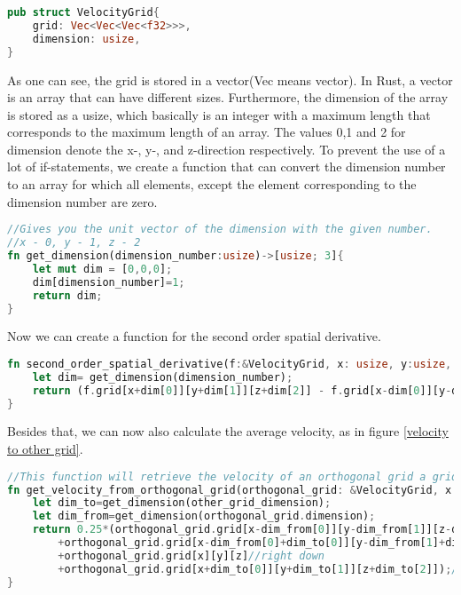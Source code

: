 \documentclass{article}
\begin{document}
\begin{lstlisting}[language=Rust, style=boxed, breaklines=true]
pub struct VelocityGrid{
    grid: Vec<Vec<Vec<f32>>>,
    dimension: usize,
}
\end{lstlisting}
As one can see, the grid is stored in a vector(Vec means vector). In Rust, a vector is an array that can have different sizes. Furthermore, the dimension of the array is stored as a usize, which basically is an integer with a maximum length that corresponds to the maximum length of an array. The values 0,1 and 2 for dimension denote the x-, y-, and z-direction respectively. To prevent the use of a lot of if-statements, we create a function that can convert the dimension number to an array for which all elements, except the element corresponding to the dimension number are zero. 
\begin{lstlisting}[language=Rust, style=boxed, breaklines=true]
//Gives you the unit vector of the dimension with the given number.
//x - 0, y - 1, z - 2
fn get_dimension(dimension_number:usize)->[usize; 3]{
    let mut dim = [0,0,0];
    dim[dimension_number]=1;
    return dim;
}
\end{lstlisting}
Now we can create a function for the second order spatial derivative.
\begin{lstlisting}[language=Rust, style=boxed, breaklines=true]
fn second_order_spatial_derivative(f:&VelocityGrid, x: usize, y:usize, z:usize, dimension_number:usize) -> f32{
    let dim= get_dimension(dimension_number);
    return (f.grid[x+dim[0]][y+dim[1]][z+dim[2]] - f.grid[x-dim[0]][y-dim[1]][z-dim[2]])/(2.0*GRIDELEMENTSCALE);
}
\end{lstlisting}
Besides that, we can now also calculate the average velocity, as in figure \ref{velocity to other grid}.
\begin{lstlisting}[language=Rust, style=boxed, breaklines=true]
//This function will retrieve the velocity of an orthogonal grid a grid point of another grid.
fn get_velocity_from_orthogonal_grid(orthogonal_grid: &VelocityGrid, x:usize, y:usize, z:usize, other_grid_dimension:usize) -> f32{
    let dim_to=get_dimension(other_grid_dimension);
    let dim_from=get_dimension(orthogonal_grid.dimension);
    return 0.25*(orthogonal_grid.grid[x-dim_from[0]][y-dim_from[1]][z-dim_from[2]]//Left down
        +orthogonal_grid.grid[x-dim_from[0]+dim_to[0]][y-dim_from[1]+dim_to[1]][z-dim_from[2]+dim_to[2]]//left up
        +orthogonal_grid.grid[x][y][z]//right down
        +orthogonal_grid.grid[x+dim_to[0]][y+dim_to[1]][z+dim_to[2]]);//right up
}
\end{lstlisting}
\end{document}
